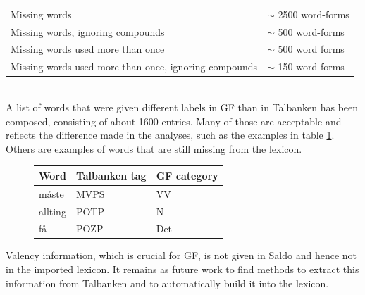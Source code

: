 \documentclass{report}
\begin{document}
\begin{tabular}{|l|l|}
\hline
Missing words & $\sim$ 2500 word-forms\\
Missing words, ignoring compounds & $\sim$ 500 word-forms\\
Missing words used more than once & $\sim$ 500 word forms\\
Missing words used more than once, ignoring compounds & $\sim$ 150 word-forms\\
\hline
\end{tabular}\\

A list of words that were given different labels in GF than in Talbanken has been
composed, consisting of about 1600 entries. Many of those are
acceptable and reflects the difference 
made in the analyses, such as the examples in table \ref{tab:saldodiff}.
Others are examples of words that are still missing from
the lexicon.
\begin{figure}[h]
\begin{tabular}{|lll|}
\hline
Word & Talbanken tag & GF category \\
\hline
måste & MVPS          & VV \\
allting & POTP & N \\
få & POZP & Det \\
\hline
\end{tabular}
\caption{}
\label{tab:saldodiff}
\end{figure}

Valency information, which is crucial for GF, is not given in Saldo and
hence not in the imported lexicon. It remains as future work to find methods 
to extract this information from Talbanken and to automatically build
it into the lexicon. 
\end{document}
